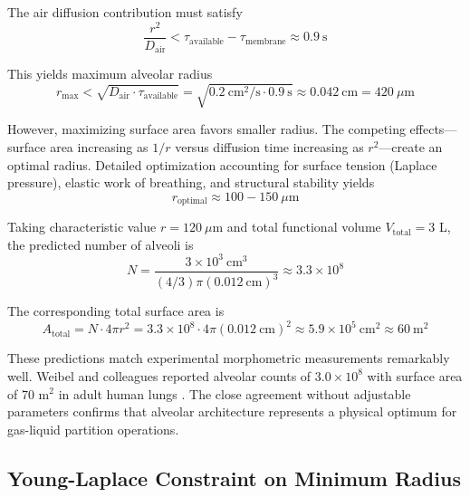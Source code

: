 \documentclass[12pt,a4paper]{article}
\theoremstyle{remark}
\begin{document}
The air diffusion contribution must satisfy
\begin{equation}
\frac{r^{2}}{D_{\mathrm{air}}} < \tau_{\mathrm{available}} - \tau_{\mathrm{membrane}} \approx 0.9~\mathrm{s}
\end{equation}

This yields maximum alveolar radius
\begin{equation}
r_{\mathrm{max}} < \sqrt{D_{\mathrm{air}} \cdot \tau_{\mathrm{available}}} = \sqrt{0.2~\mathrm{cm}^{2}/\mathrm{s} \cdot 0.9~\mathrm{s}} \approx 0.042~\mathrm{cm} = 420~\mu\mathrm{m}
\end{equation}

However, maximizing surface area favors smaller radius. The competing effects—surface area increasing as $1/r$ versus diffusion time increasing as $r^{2}$—create an optimal radius. Detailed optimization accounting for surface tension (Laplace pressure), elastic work of breathing, and structural stability yields
\begin{equation}
r_{\mathrm{optimal}} \approx 100-150~\mu\mathrm{m}
\end{equation}

Taking characteristic value $r = 120~\mu$m and total functional volume $V_{\mathrm{total}} = 3$ L, the predicted number of alveoli is
\begin{equation}
N = \frac{3 \times 10^{3}~\mathrm{cm}^{3}}{(4/3)\pi(0.012~\mathrm{cm})^{3}} \approx 3.3 \times 10^{8}
\end{equation}

The corresponding total surface area is
\begin{equation}
A_{\mathrm{total}} = N \cdot 4\pi r^{2} = 3.3 \times 10^{8} \cdot 4\pi(0.012~\mathrm{cm})^{2} \approx 5.9 \times 10^{5}~\mathrm{cm}^{2} \approx 60~\mathrm{m}^{2}
\end{equation}

These predictions match experimental morphometric measurements remarkably well. Weibel and colleagues reported alveolar counts of $3.0 \times 10^{8}$ with surface area of 70 m$^{2}$ in adult human lungs \cite{weibel1963morphometry}. The close agreement without adjustable parameters confirms that alveolar architecture represents a physical optimum for gas-liquid partition operations.

\subsection{Young-Laplace Constraint on Minimum Radius}
\end{document}
